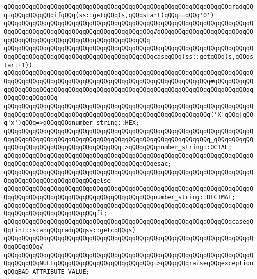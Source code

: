 \newline
\verb|qQQqqQQqqQQqqQQqqQQqqQQqqQQqqQQqqQQqqQQqqQQqqQQqqQQqqQQqqQQqqQQqradqQQq=qQQqqQQqqQQqifqQQq(ss::getqQQq(s,qQQqstart)qQQq==qQQq'0')|\newline
\verb|qQQqqQQqqQQqqQQqqQQqqQQqqQQqqQQqqQQqqQQqqQQqqQQqqQQqqQQqqQQqqQQqqQQqqQQqqQQqqQQqqQQqqQQqqQQqqQQqqQQqqQQqqQQqqQQq#qQQqqQQqqQQqqQQqqQQqqQQqqQQqqQQqqQQqqQQqqQQqqQQqqQQqqQQqqQQqqQQqqQQq|\newline
\verb|qQQqqQQqqQQqqQQqqQQqqQQqqQQqqQQqqQQqqQQqqQQqqQQqqQQqqQQqqQQqqQQqqQQqqQQqqQQqqQQqqQQqqQQqqQQqqQQqqQQqqQQqqQQqqQQqcaseqQQq(ss::getqQQq(s,qQQqstart+1))|\newline
\verb|qQQqqQQqqQQqqQQqqQQqqQQqqQQqqQQqqQQqqQQqqQQqqQQqqQQqqQQqqQQqqQQqqQQqqQQqqQQqqQQqqQQqqQQqqQQqqQQqqQQqqQQqqQQqqQQqqQQqqQQqqQQqqQQq#qQQqqQQqqQQqqQQqqQQqqQQqqQQqqQQqqQQqqQQqqQQqqQQqqQQqqQQqqQQqqQQqqQQqqQQqqQQqqQQqqQQqqQQqqQQqqQQq|\newline
\verb|qQQqqQQqqQQqqQQqqQQqqQQqqQQqqQQqqQQqqQQqqQQqqQQqqQQqqQQqqQQqqQQqqQQqqQQqqQQqqQQqqQQqqQQqqQQqqQQqqQQqqQQqqQQqqQQqqQQqqQQqqQQqqQQq('X'qQQq|\verb#|qQQq'x')qQQq=>qQQqqQQqnumber_string::HEX;#\newline
\verb|qQQqqQQqqQQqqQQqqQQqqQQqqQQqqQQqqQQqqQQqqQQqqQQqqQQqqQQqqQQqqQQqqQQqqQQqqQQqqQQqqQQqqQQqqQQqqQQqqQQqqQQqqQQqqQQqqQQqqQQqqQQqqQQq_qQQqqQQqqQQqqQQqqQQqqQQqqQQqqQQqqQQqqQQqqQQq=>qQQqqQQqnumber_string::OCTAL;|\newline
\verb|qQQqqQQqqQQqqQQqqQQqqQQqqQQqqQQqqQQqqQQqqQQqqQQqqQQqqQQqqQQqqQQqqQQqqQQqqQQqqQQqqQQqqQQqqQQqqQQqqQQqqQQqqQQqqQQqesac;|\newline
\verb|qQQqqQQqqQQqqQQqqQQqqQQqqQQqqQQqqQQqqQQqqQQqqQQqqQQqqQQqqQQqqQQqqQQqqQQqqQQqqQQqqQQqqQQqqQQqqQQqelse|\newline
\verb|qQQqqQQqqQQqqQQqqQQqqQQqqQQqqQQqqQQqqQQqqQQqqQQqqQQqqQQqqQQqqQQqqQQqqQQqqQQqqQQqqQQqqQQqqQQqqQQqqQQqqQQqqQQqqQQqnumber_string::DECIMAL;|\newline
\verb|qQQqqQQqqQQqqQQqqQQqqQQqqQQqqQQqqQQqqQQqqQQqqQQqqQQqqQQqqQQqqQQqqQQqqQQqqQQqqQQqqQQqqQQqqQQqqQQqfi;|\newline
\newline
\verb|qQQqqQQqqQQqqQQqqQQqqQQqqQQqqQQqqQQqqQQqqQQqqQQqqQQqqQQqqQQqqQQqcaseqQQq(int::scanqQQqradqQQqss::getcqQQqs)|\newline
\verb|qQQqqQQqqQQqqQQqqQQqqQQqqQQqqQQqqQQqqQQqqQQqqQQqqQQqqQQqqQQqqQQqqQQqqQQqqQQqqQQq#|\newline
\verb|qQQqqQQqqQQqqQQqqQQqqQQqqQQqqQQqqQQqqQQqqQQqqQQqqQQqqQQqqQQqqQQqqQQqqQQqqQQqqQQqNULLqQQqqQQqqQQqqQQqqQQqqQQqqQQq=>qQQqqQQqraiseqQQqexceptionqQQqBAD_ATTRIBUTE_VALUE;|\newline

